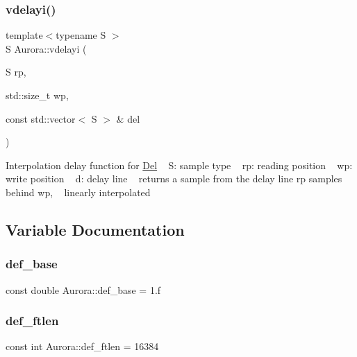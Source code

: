 \subsubsection{\texorpdfstring{vdelayi()}{vdelayi()}}
{\footnotesize\ttfamily template$<$typename S $>$ \\
S Aurora\+::vdelayi (\begin{DoxyParamCaption}\item[{S}]{rp,  }\item[{std\+::size\+\_\+t}]{wp,  }\item[{const std\+::vector$<$ S $>$ \&}]{del }\end{DoxyParamCaption})}

Interpolation delay function for \hyperlink{class_aurora_1_1_del}{Del} ~\newline
S\+: sample type ~\newline
rp\+: reading position ~\newline
wp\+: write position ~\newline
d\+: delay line ~\newline
returns a sample from the delay line rp samples behind wp, ~\newline
linearly interpolated 

\subsection{Variable Documentation}
\mbox{\label{namespace_aurora_acb267dff62f74484893c2d5b679b78bf}} 
\subsubsection{\texorpdfstring{def\+\_\+base}{def\_base}}
{\footnotesize\ttfamily const double Aurora\+::def\+\_\+base = 1.f}

\mbox{\label{namespace_aurora_a14dabfd9feedfa09c0e6f86d2627f006}} 
\subsubsection{\texorpdfstring{def\+\_\+ftlen}{def\_ftlen}}
{\footnotesize\ttfamily const int Aurora\+::def\+\_\+ftlen = 16384}

